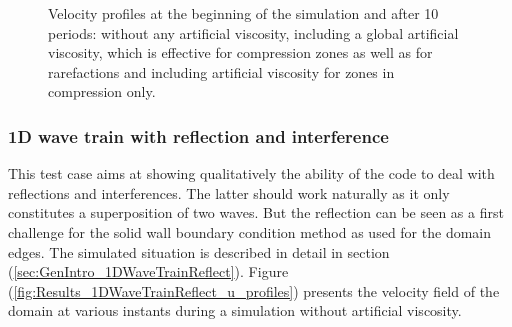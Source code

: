 \documentclass[11pt,a4paper,twoside]{report}
\begin{document}
\begin{figure}[h]
{}
\caption[Velocity profiles 1D traveling wave]{Velocity profiles at the beginning of the simulation and after 10 periods:  without any artificial viscosity,  including a global artificial viscosity, which is effective for compression zones as well as for rarefactions and  including artificial viscosity for zones in compression only.}

\end{figure}


\subsubsection{1D wave train with reflection and interference}
This test case aims at showing qualitatively the ability of the code to deal with reflections and interferences. The latter should work naturally as it only constitutes a superposition of two waves. But the reflection can be seen as a first challenge for the solid wall boundary condition method as used for the domain edges.
The simulated situation is described in detail in section (\ref{sec:GenIntro_1DWaveTrainReflect}). Figure (\ref{fig:Results_1DWaveTrainReflect_u_profiles}) presents the velocity field of the domain at various instants during a simulation without artificial viscosity.
\end{document}
